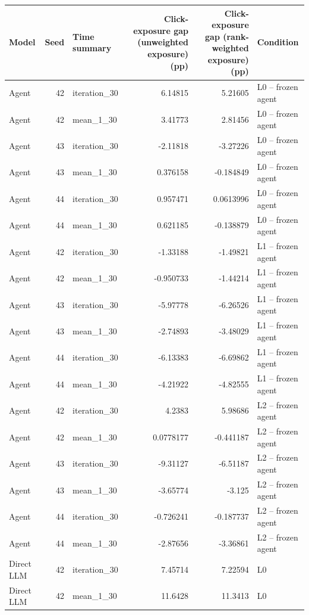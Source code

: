 \begin{table}[htbp!]
\centering
\small
\setlength{\tabcolsep}{3pt}
\renewcommand{\arraystretch}{1.1}
\begin{tabular}{lrlrrl}
\hline
Model & Seed & Time summary & Click-exposure gap (unweighted exposure) (pp) & Click-exposure gap (rank-weighted exposure) (pp) & Condition \\
\hline
Agent & 42 & iteration\_30 & 6.14815 & 5.21605 & L0 -- frozen agent \\
Agent & 42 & mean\_1\_30 & 3.41773 & 2.81456 & L0 -- frozen agent \\
Agent & 43 & iteration\_30 & -2.11818 & -3.27226 & L0 -- frozen agent \\
Agent & 43 & mean\_1\_30 & 0.376158 & -0.184849 & L0 -- frozen agent \\
Agent & 44 & iteration\_30 & 0.957471 & 0.0613996 & L0 -- frozen agent \\
Agent & 44 & mean\_1\_30 & 0.621185 & -0.138879 & L0 -- frozen agent \\
Agent & 42 & iteration\_30 & -1.33188 & -1.49821 & L1 -- frozen agent \\
Agent & 42 & mean\_1\_30 & -0.950733 & -1.44214 & L1 -- frozen agent \\
Agent & 43 & iteration\_30 & -5.97778 & -6.26526 & L1 -- frozen agent \\
Agent & 43 & mean\_1\_30 & -2.74893 & -3.48029 & L1 -- frozen agent \\
Agent & 44 & iteration\_30 & -6.13383 & -6.69862 & L1 -- frozen agent \\
Agent & 44 & mean\_1\_30 & -4.21922 & -4.82555 & L1 -- frozen agent \\
Agent & 42 & iteration\_30 & 4.2383 & 5.98686 & L2 -- frozen agent \\
Agent & 42 & mean\_1\_30 & 0.0778177 & -0.441187 & L2 -- frozen agent \\
Agent & 43 & iteration\_30 & -9.31127 & -6.51187 & L2 -- frozen agent \\
Agent & 43 & mean\_1\_30 & -3.65774 & -3.125 & L2 -- frozen agent \\
Agent & 44 & iteration\_30 & -0.726241 & -0.187737 & L2 -- frozen agent \\
Agent & 44 & mean\_1\_30 & -2.87656 & -3.36861 & L2 -- frozen agent \\
Direct LLM & 42 & iteration\_30 & 7.45714 & 7.22594 & L0 \\
Direct LLM & 42 & mean\_1\_30 & 11.6428 & 11.3413 & L0 \\

\end{tabular}
\end{table}
